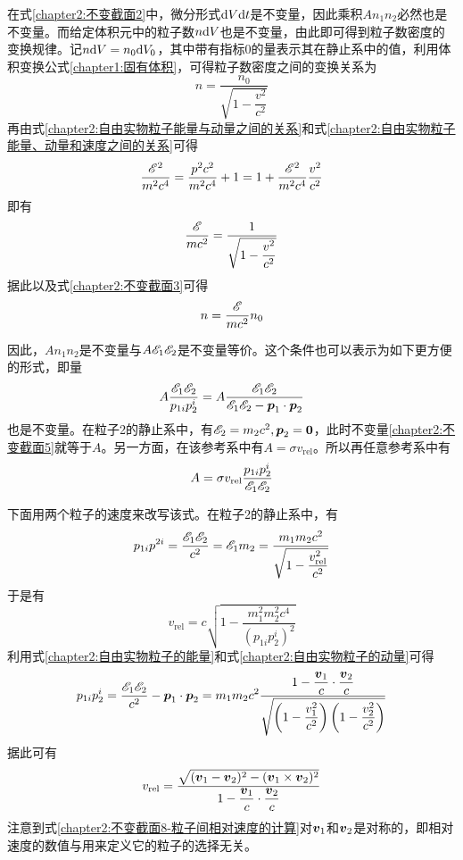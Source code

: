 在式\eqref{chapter2:不变截面2}中，微分形式$\mathrm{d} V\mathrm{d} t$是不变量，因此乘积$An_1n_2$必然也是不变量。而给定体积元中的粒子数$n\mathrm{d} V$也是不变量，由此即可得到粒子数密度的变换规律。记$n\mathrm{d} V = n_0\mathrm{d} V_0$，其中带有指标$0$的量表示其在静止系中的值，利用体积变换公式\eqref{chapter1:固有体积}，可得粒子数密度之间的变换关系为
\begin{equation}
	n = \frac{n_0}{\sqrt{1-\dfrac{v^2}{c^2}}}
	\label{chapter2:不变截面3}
\end{equation}
再由式\eqref{chapter2:自由实物粒子能量与动量之间的关系}和式\eqref{chapter2:自由实物粒子能量、动量和速度之间的关系}可得
\begin{equation*}
	\frac{\mathscr{E}^2}{m^2c^4} = \frac{p^2c^2}{m^2c^4} + 1 = 1 + \frac{\mathscr{E}^2}{m^2c^4} \frac{v^2}{c^2}
\end{equation*}
即有
\begin{equation*}
	\frac{\mathscr{E}}{mc^2} = \frac{1}{\sqrt{1-\dfrac{v^2}{c^2}}}
\end{equation*}
据此以及式\eqref{chapter2:不变截面3}可得
\begin{equation}
	n = \frac{\mathscr{E}}{mc^2}n_0
	\label{chapter2:不变截面4}
\end{equation}

因此，$An_1n_2$是不变量与$A\mathscr{E}_1\mathscr{E}_2$是不变量等价。这个条件也可以表示为如下更方便的形式，即量
\begin{equation}
	A\frac{\mathscr{E}_1\mathscr{E}_2}{p_{1i}p_2^i} = A\frac{\mathscr{E}_1\mathscr{E}_2}{\mathscr{E}_1\mathscr{E}_2-\boldsymbol{p}_1\cdot \boldsymbol{p}_2}
	\label{chapter2:不变截面5}
\end{equation}
也是不变量。在粒子2的静止系中，有$\mathscr{E}_2=m_2c^2, \boldsymbol{p}_2=\boldsymbol{0}$，此时不变量\eqref{chapter2:不变截面5}就等于$A$。另一方面，在该参考系中有$A = \sigma v_{\text{rel}}$。所以再任意参考系中有
\begin{equation}
	A = \sigma v_{\text{rel}} \frac{p_{1i}p_2^i}{\mathscr{E}_1\mathscr{E}_2}
	\label{chapter2:不变截面6}
\end{equation}

下面用两个粒子的速度来改写该式。在粒子2的静止系中，有
\begin{equation*}
	p_{1i}p^{2i} = \frac{\mathscr{E}_1\mathscr{E}_2}{c^2} = \mathscr{E}_1m_2 = \frac{m_1m_2c^2}{\sqrt{1-\dfrac{v_{\text{rel}}^2}{c^2}}}
\end{equation*}
于是有
\begin{equation}
	v_{\text{rel}} = c\sqrt{1-\frac{m_1^2m_2^2c^4}{(p_{1i}p_2^i)^2}}
	\label{chapter2:不变截面7}
\end{equation}
利用式\eqref{chapter2:自由实物粒子的能量}和式\eqref{chapter2:自由实物粒子的动量}可得
\begin{equation*}
	p_{1i}p_2^i = \frac{\mathscr{E}_1\mathscr{E}_2}{c^2} - \boldsymbol{p}_1\cdot\boldsymbol{p}_2 = m_1m_2c^2 \frac{1-\dfrac{\boldsymbol{v}_1}{c}\cdot \dfrac{\boldsymbol{v}_2}{c}}{\sqrt{\left(1-\dfrac{v_1^2}{c^2}\right)\left(1-\dfrac{v_2^2}{c^2}\right)}}
\end{equation*}
据此可有
\begin{equation}
	v_{\text{rel}} = \frac{\sqrt{(\boldsymbol{v}_1-\boldsymbol{v}_2)^2-(\boldsymbol{v}_1 \times \boldsymbol{v}_2)^2}}{1-\dfrac{\boldsymbol{v}_1}{c}\cdot \dfrac{\boldsymbol{v}_2}{c}}
	\label{chapter2:不变截面8-粒子间相对速度的计算}
\end{equation}
注意到式\eqref{chapter2:不变截面8-粒子间相对速度的计算}对$\boldsymbol{v}_1$和$\boldsymbol{v}_2$是对称的，即相对速度的数值与用来定义它的粒子的选择无关。

